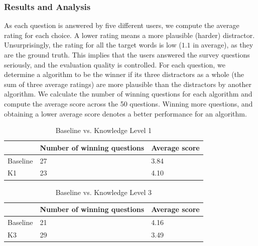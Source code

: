 \subsubsection{Results and Analysis}
As each question is answered by five different users, we compute the average rating for each choice. A lower rating means a more plausible (harder) distractor. 
Unsurprisingly, the rating for all the target words is low ($1.1$ in average), as they are the ground truth. This implies that the users answered the survey questions seriously, and the evaluation quality is controlled. For each question, we determine a  algorithm to be the winner if its three distractors as a whole (the sum of three average ratings) are more plausible than the distractors by another algorithm. We calculate the number of winning questions for each algorithm and compute the average score across the 50 questions.  Winning more questions, and obtaining a lower average score denotes a better performance for an algorithm.




\begin{table}[th]
    \caption{ Baseline vs. Knowledge Level 1}
    \label{table:distractor_1}
    \begin{center}
    \begin{tabular}{| p{1.5cm} | p{2.5cm} | p{2.2cm} |}
        \hline
         & Number of winning questions & Average score\\
        \hline
        Baseline & 27 & 3.84\\
        \hline
        K1 & 23 & 4.10\\
        \hline
    \end{tabular}
    \end{center}
\end{table}

\begin{table}[th]
    \caption{Baseline vs. Knowledge Level 3 }
    \label{table:distractor_2}
    \begin{center}
    \begin{tabular}{| p{1.5cm} | p{2.5cm} | p{2.2cm} |}
        \hline
         & Number of winning questions & Average score\\
        \hline
        Baseline & 21 & 4.16\\
        \hline
        K3 & 29 & 3.49\\
        \hline
    \end{tabular}
    \end{center}
\end{table}

